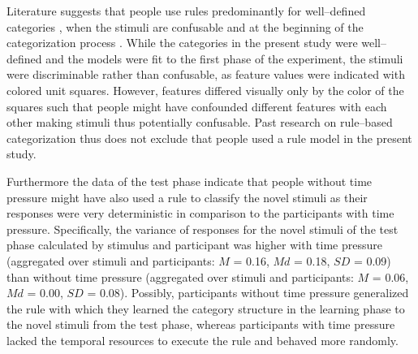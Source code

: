 \documentclass[a4paper,man,natbib]{apa6}
\begin{document}
Literature suggests that people use rules predominantly for well--defined categories \citep{restle1962selection, tom1968attention}, when the stimuli are confusable \citep{rouder2006comparing} and at the beginning of the categorization process \citep{rouder2006comparing}. While the categories in the present study were well--defined and the models were fit to the first phase of the experiment, the stimuli were discriminable rather than confusable, as feature values were indicated with colored unit squares. However, features differed visually only by the color of the squares such that people might have confounded different features with each other making stimuli thus potentially confusable. 
Past research on rule--based categorization thus does not exclude that people used a rule model in the present study. 

Furthermore the data of the test phase indicate that people without time pressure might have also used a rule to classify the novel stimuli as their responses were very deterministic in comparison to the participants with time pressure. Specifically, the variance of responses for the novel stimuli of the test phase calculated by stimulus and participant was higher with time pressure (aggregated over stimuli and participants: $M$ = 0.16, $Md$ = 0.18, $SD$ = 0.09) than without time pressure (aggregated over stimuli and participants: $M$ = 0.06, $Md$ = 0.00, $SD$ = 0.08). Possibly, participants without time pressure generalized the rule with which they learned the category structure in the learning phase to the novel stimuli from the test phase, whereas participants with time pressure lacked the temporal resources to execute the rule and behaved more randomly.
\end{document}
